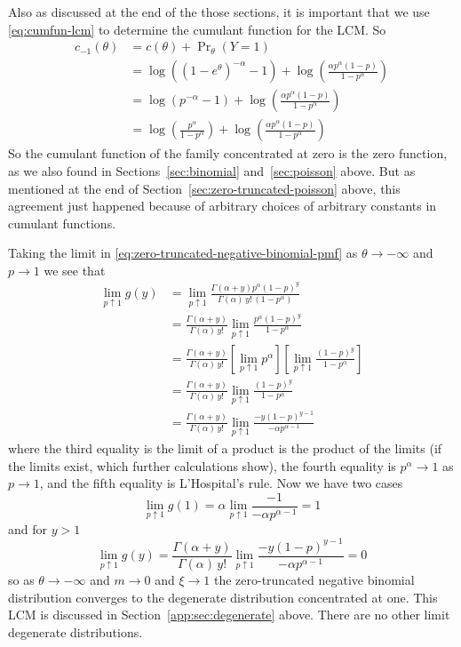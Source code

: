 Also as discussed at the end of the those sections,
it is important that we use \eqref{eq:cumfun-lcm} to determine the cumulant
function for the LCM.  So
\begin{align*}
   c_{- 1}(\theta)
   & =
   c(\theta) + \Pr\nolimits_\theta(Y = 1)
   \\
   & =
   \log\left((1 - e^\theta)^{- \alpha} - 1\right)
   +
   \log\left(\frac{\alpha p^\alpha (1 - p)}{1 - p^\alpha}\right)
   \\
   & =
   \log\left(p^{- \alpha} - 1\right)
   +
   \log\left(\frac{\alpha p^\alpha (1 - p)}{1 - p^\alpha}\right)
   \\
   & =
   \log\left(\frac{p^\alpha}{1 - p^\alpha}\right)
   +
   \log\left(\frac{\alpha p^\alpha (1 - p)}{1 - p^\alpha}\right)
\end{align*}
So the cumulant function of the family concentrated at zero is the zero
function, as we also found in Sections~\ref{sec:binomial} and~\ref{sec:poisson}
above.  But as mentioned at the end of Section~\ref{sec:zero-truncated-poisson}
above, this agreement just happened because of arbitrary choices of arbitrary
constants in cumulant functions.

\REVISED

Taking the limit in
\eqref{eq:zero-truncated-negative-binomial-pmf}
as $\theta \to - \infty$ and $p \to 1$ we see that
\begin{align*}
   \lim_{p \uparrow 1} g(y)
   & =
   \lim_{p \uparrow 1}
   \frac{\Gamma(\alpha + y) p^\alpha (1-p)^y}
   {\Gamma(\alpha) \, y! \, (1 - p^\alpha)}
   \\
   & =
   \frac{\Gamma(\alpha + y)}{\Gamma(\alpha) \, y!}
   \lim_{p \uparrow 1}
   \frac{p^\alpha (1-p)^y}{1 - p^\alpha}
   \\
   & =
   \frac{\Gamma(\alpha + y)}{\Gamma(\alpha) \, y!}
   \left[ \lim_{p \uparrow 1} p^\alpha \right]
   \left[ \lim_{p \uparrow 1} \frac{(1-p)^y}{1 - p^\alpha} \right]
   \\
   & =
   \frac{\Gamma(\alpha + y)}{\Gamma(\alpha) \, y!}
   \lim_{p \uparrow 1}
   \frac{(1-p)^y}{1 - p^\alpha}
   \\
   & =
   \frac{\Gamma(\alpha + y)}{\Gamma(\alpha) \, y!}
   \lim_{p \uparrow 1}
   \frac{- y (1-p)^{y - 1}}{- \alpha p^{\alpha - 1}}
\end{align*}
where the third equality is the limit of a product is the product of the limits
(if the limits exist, which further calculations show), the fourth equality
is $p^\alpha \to 1$ as $p \to 1$, and the fifth equality is L'Hospital's rule.
Now we have two cases
$$
   \lim_{p \uparrow 1} g(1)
   =
   \alpha \lim_{p \uparrow 1}
   \frac{- 1}{- \alpha p^{\alpha - 1}}
   =
   1
$$
and for $y > 1$
$$
   \lim_{p \uparrow 1} g(y)
   =
   \frac{\Gamma(\alpha + y)}{\Gamma(\alpha) \, y!}
   \lim_{p \uparrow 1}
   \frac{- y (1-p)^{y - 1}}{- \alpha p^{\alpha - 1}}
   =
   0
$$
so as $\theta \to - \infty$ and $m \to 0$ and $\xi \to 1$
the zero-truncated negative binomial distribution converges to
the degenerate distribution concentrated at one.
This LCM is discussed in Section~\ref{app:sec:degenerate} above.
There are no other limit degenerate distributions.

